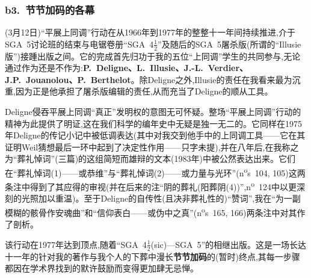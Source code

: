 \subsubsection*{b3.~节节加码的各幕}


\dmark{}(3月12日)“平展上同调”行动在从1966年到1977年的整整十一年间持续推进,介于SGA~5讨论班的结束与电锯卷册“SGA~4$\frac{1}{2}$”及随后的SGA~5屠杀版(所谓的“Illusie版”)接踵出版之间。它的完成首先归功于我的五位“上同调”学生的共同参与,无论通过作为还是不作为:\textbf{P.~Deligne、L.~Illusie、J.-L.~Verdier、J.P.~Jouanolou、P.~Berthelot}。除Deligne之外,Illusie的责任在我看来最为沉重,因为正是他承担了屠杀版编辑的责任,从而充当了Deligne的顺从工具\dmark{}。

Deligne侵吞平展上同调“真正”发明权的意图无可怀疑。整场“平展上同调”行动的精神为此提供了明证,这在我们科学的编年史中无疑是独一无二的。它同样在1975年Deligne的传记小记中被低调表达(其中对我交到他手中的上同调工具——它在其证明Weil猜想最后一环中起到了决定性作用——只字未提),并在八年后,在我称之为“葬礼悼词”(三篇)的这组简短而雄辩的文本(1983年)中被公然表达出来。它们在“葬礼悼词(1)——或恭维”与“葬礼悼词(2)——或力量与光环”(n\textsuperscript{o}s~104, 105)这两条注中得到了其应得的审视(并在后来的注“阴的葬礼(阳葬阴(4))”,n\textsuperscript{o}~124中以更深刻的光照加以重温)。至于Deligne的自传性(且决非葬礼性的)“赞词”,我在“为一副模糊的骸骨作安魂曲”和“信仰表白——或伪中之真”(n\textsuperscript{o}s~165, 166)两条注中对其作了剖析。

该行动在1977年达到顶点,随着“SGA~4$\frac{1}{2}$(sic)—SGA~5”的相继出版\dmark{}。这是一场长达十一年的针对我的著作与我个人的下葬中漫长\textbf{节节加码}的(暂时)终点,其每一步骤都因在学术界找到的默许鼓励而变得更加肆无忌惮。

